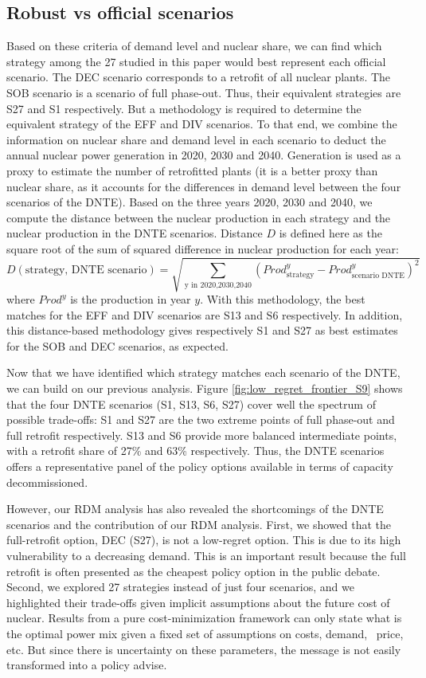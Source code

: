 \subsection{Robust vs official scenarios}
Based on these criteria of demand level and nuclear share, we can find which strategy among the 27 studied in this paper would best represent each official scenario. 
The DEC scenario corresponds to a retrofit of all nuclear plants. The SOB scenario is a scenario of full phase-out. Thus, their equivalent strategies are S27 and S1 respectively. But a methodology is required to determine the equivalent strategy of the EFF and DIV scenarios. 
To that end, we combine the information on nuclear share and demand level in each scenario to deduct the annual nuclear power generation in 2020, 2030 and 2040.
Generation is used as a proxy to estimate the number of retrofitted plants (it is a better proxy than nuclear share, as it accounts for the differences in demand level between the four scenarios of the DNTE). Based on the three years 2020, 2030 and 2040, we compute the distance between the nuclear production in each strategy and the nuclear production in the DNTE scenarios. Distance $D$ is defined here as the square root of the sum of squared difference in nuclear production for each year:
$$D(\text{strategy, DNTE scenario}) = \sqrt{ \sum_{\text{y in {2020,2030,2040}}} (Prod^y_{\text{strategy}} - Prod^y_{\text{scenario DNTE}})^2}$$
where $Prod^y$ is the production in year $y$.
With this methodology, the best matches for the EFF and DIV scenarios are S13 and S6 respectively. In addition, this distance-based methodology gives respectively S1 and S27 as best estimates for the SOB and DEC scenarios, as expected.

Now that we have identified which strategy matches each scenario of the DNTE, we can build on our previous analysis. Figure \ref{fig:low_regret_frontier_S9} shows that the four DNTE scenarios (S1, S13, S6, S27) cover well the spectrum of possible trade-offs: S1 and S27 are the two extreme points of full phase-out and full retrofit respectively. S13 and S6 provide more balanced intermediate points, with a retrofit share of 27\% and 63\% respectively. Thus, the DNTE scenarios offers a representative panel of the policy options available in terms of capacity decommissioned.

However, our RDM analysis has also revealed the shortcomings of the DNTE scenarios and the contribution of our RDM analysis. 
First, we showed that the full-retrofit option, DEC (S27), is not a low-regret option. This is due to its high vulnerability to a decreasing demand. This is an important result because the full retrofit is often presented as the cheapest policy option in the public debate.
Second, we explored 27 strategies instead of just four scenarios, and we highlighted their trade-offs given implicit assumptions about the future cost of nuclear. 
Results from a pure cost-minimization framework can only state what is the optimal power mix given a fixed set of assumptions on costs, demand, \coo\ price, etc. But since there is uncertainty on these parameters, the message is not easily transformed into a policy advise.

